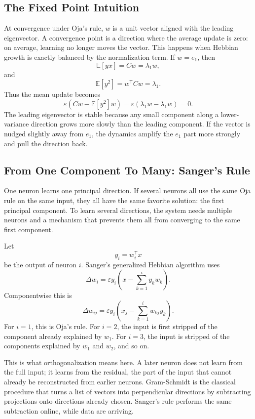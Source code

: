 \subsection{The Fixed Point Intuition}

At convergence under Oja's rule, \(w\) is a unit vector aligned with the leading eigenvector. A convergence point is a direction where the average update is zero: on average, learning no longer moves the vector. This happens when Hebbian growth is exactly balanced by the normalization term. If \(w=e_1\), then
\[
  \mathbb{E}[yx]
  =
  Cw
  =
  \lambda_1 w,
\]
and
\[
  \mathbb{E}[y^2]
  =
  w^{\mathsf{T}}Cw
  =
  \lambda_1.
\]
Thus the mean update becomes
\[
  \varepsilon(Cw-\mathbb{E}[y^2]w)
  =
  \varepsilon(\lambda_1w-\lambda_1w)
  =
  0.
\]
The leading eigenvector is stable because any small component along a lower-variance direction grows more slowly than the leading component. If the vector is nudged slightly away from \(e_1\), the dynamics amplify the \(e_1\) part more strongly and pull the direction back.

\subsection{From One Component To Many: Sanger's Rule}

One neuron learns one principal direction. If several neurons all use the same Oja rule on the same input, they all have the same favorite solution: the first principal component. To learn several directions, the system needs multiple neurons and a mechanism that prevents them all from converging to the same first component.

Let
\[
  y_i=w_i^{\mathsf{T}}x
\]
be the output of neuron \(i\). Sanger's generalized Hebbian algorithm uses
\[
  \Delta w_i
  =
  \varepsilon y_i
  \left(
    x-\sum_{k=1}^{i}y_kw_k
  \right).
\]
Componentwise this is
\[
  \Delta w_{ij}
  =
  \varepsilon y_i
  \left(
    x_j-\sum_{k=1}^{i}w_{kj}y_k
  \right).
\]
For \(i=1\), this is Oja's rule. For \(i=2\), the input is first stripped of the component already explained by \(w_1\). For \(i=3\), the input is stripped of the components explained by \(w_1\) and \(w_2\), and so on.

This is what orthogonalization means here. A later neuron does not learn from the full input; it learns from the residual, the part of the input that cannot already be reconstructed from earlier neurons. Gram-Schmidt is the classical procedure that turns a list of vectors into perpendicular directions by subtracting projections onto directions already chosen. Sanger's rule performs the same subtraction online, while data are arriving.

